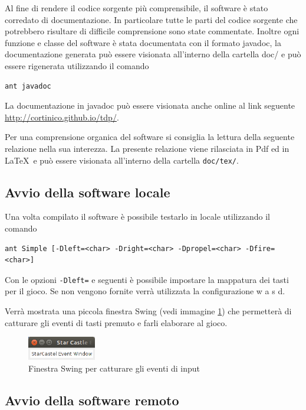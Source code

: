\documentclass[a4paper,12pt]{article}
\begin{document}
Al fine di rendere il codice sorgente pi\`u comprensibile, il software \`e stato corredato di documentazione. In particolare tutte le parti del codice sorgente che potrebbero risultare di difficile comprensione sono state commentate. Inoltre ogni funzione e classe del software \`e stata documentata con il formato \textsf {javadoc}, la documentazione generata pu\`o essere visionata all'interno della cartella \textsf{doc/} e pu\`o essere rigenerata utilizzando il comando
\begin{lstlisting}[basicstyle=\ttfamily]
ant javadoc
\end{lstlisting}

La documentazione in javadoc pu\`o essere visionata anche online al link seguente \url{http://cortinico.github.io/tdp/}.

Per una comprensione organica del software si consiglia la lettura della seguente relazione nella sua interezza. La presente relazione viene rilasciata in Pdf ed in \LaTeX\ e pu\`o essere visionata all'interno della cartella \texttt{doc/tex/}.

\subsection{Avvio della software locale}

Una volta compilato il software \`e possibile testarlo in locale utilizzando il comando
\begin{lstlisting}[basicstyle=\ttfamily]
ant Simple [-Dleft=<char> -Dright=<char> -Dpropel=<char> -Dfire=<char>]
\end{lstlisting}

Con le opzioni \texttt{-Dleft=} e seguenti \`e possibile impostare la mappatura dei tasti per il gioco. Se non vengono fornite verr\`a utilizzata la configurazione \textsf{w a s d}.

Verr\`a mostrata una piccola finestra Swing (vedi immagine \ref{img:Swing}) che permetter\`a di catturare gli eventi di tasti premuto e farli elaborare al gioco.

\begin{figure}[h]
\centering
\includegraphics[width=3cm]{swing.png}
\caption{Finestra Swing per catturare gli eventi di input}
\label{img:Swing}
\end{figure}

\subsection{Avvio della software remoto}
\end{document}
